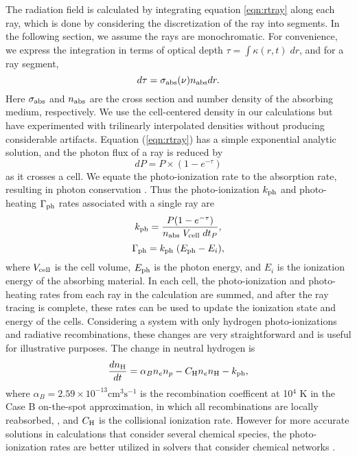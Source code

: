 \documentclass[12pt,preprint]{aastex}
\begin{document}
The radiation field is calculated by integrating equation
\ref{eqn:rtray} along each ray, which is done by considering the
discretization of the ray into segments.  In the following section, we
assume the rays are monochromatic.  For convenience, we express the
integration in terms of optical depth $\tau = \int \kappa(r,t) \;
dr$, and for a ray segment,
%
\begin{equation}
  \label{eqn:dtau}
  d\tau = \sigma_{\rm abs}(\nu) n_{\rm abs} dr.
\end{equation}
Here $\sigma_{\rm abs}$ and $n_{\rm abs}$ are the cross section and
number density of the absorbing medium, respectively.  We use the
cell-centered density in our calculations but have experimented with
trilinearly interpolated densities \citep[see][]{Mellema06} without
producing considerable artifacts.  Equation (\ref{eqn:rtray}) has a
simple exponential analytic solution, and the photon flux of a ray is
reduced by
%
\begin{equation}
  \label{eqn:flux}
  dP = P \times (1 - e^{-\tau})
\end{equation}
as it crosses a cell.  We equate the photo-ionization rate to the
absorption rate, resulting in photon conservation \citep{Abel99_RT,
  Mellema06}.  Thus the photo-ionization $k_{\rm ph}$ and
photo-heating $\Gamma_{\rm ph}$ rates associated with a single ray are
%
\begin{equation}
  \label{eqn:kph}
  k_{\rm ph} = \frac{P (1 - e^{-\tau})}{n_{\rm abs} \; V_{\rm cell} \; dt_P},
\end{equation}
\begin{equation}
  \label{eqn:gamma}
  \Gamma_{\rm ph} = k_{\rm ph} \; (E_{\rm ph} - E_i),
\end{equation}
where $V_{\rm cell}$ is the cell volume, $E_{\rm ph}$ is the photon
energy, and $E_i$ is the ionization energy of the absorbing material.
In each cell, the photo-ionization and photo-heating rates from each
ray in the calculation are summed, and after the ray tracing is
complete, these rates can be used to update the ionization state and
energy of the cells.  Considering a system with only hydrogen
photo-ionizations and radiative recombinations, these changes are very
straightforward and is useful for illustrative purposes.  The change
in neutral hydrogen is
%
\begin{equation}
\frac{dn_{\rm H}}{dt} = \alpha_B n_e n_p - C_{\rm H} n_e n_{\rm
  H} - k_{\rm ph},
\end{equation}
where $\alpha_B = 2.59 \times 10^{-13} \mathrm{cm}^3 \mathrm{s}^{-1}$
is the recombination coefficent at 10$^4$ K in the Case B on-the-spot
approximation, in which all recombinations are locally reabsorbed,
\citep{Spitzer78}, and $C_{\rm H}$ is the collisional ionization rate.
However for more accurate solutions in calculations that consider
several chemical species, the photo-ionization rates are better
utilized in solvers that consider chemical networks
\citep[e.g.][]{Abel97}.
\end{document}

